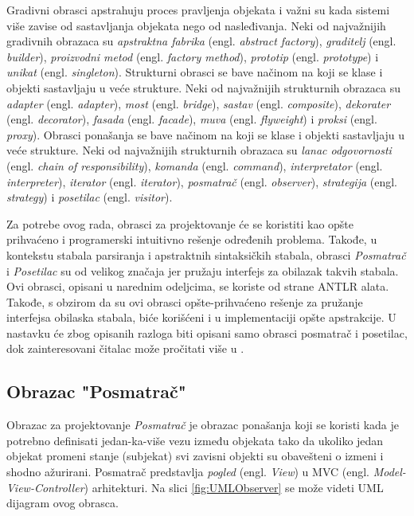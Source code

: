 Gradivni obrasci apstrahuju proces pravljenja objekata i važni su kada sistemi više zavise od sastavljanja objekata nego od nasleđivanja. Neki od najvažnijih gradivnih obrazaca su \emph{apstraktna fabrika} (engl. \emph{abstract factory}), \emph{graditelj} (engl. \emph{builder}), \emph{proizvodni metod} (engl. \emph{factory method}), \emph{prototip} (engl. \emph{prototype}) i \emph{unikat} (engl. \emph{singleton}). Strukturni obrasci se bave načinom na koji se klase i objekti sastavljaju u veće strukture. Neki od najvažnijih strukturnih obrazaca su \emph{adapter} (engl. \emph{adapter}), \emph{most} (engl. \emph{bridge}), \emph{sastav} (engl. \emph{composite}), \emph{dekorater} (engl. \emph{decorator}), \emph{fasada} (engl. \emph{facade}), \emph{muva} (engl. \emph{flyweight}) i \emph{proksi} (engl. \emph{proxy}). Obrasci ponašanja se bave načinom na koji se klase i objekti sastavljaju u veće strukture. Neki od najvažnijih strukturnih obrazaca su \emph{lanac odgovornosti} (engl. \emph{chain of responsibility}), \emph{komanda} (engl. \emph{command}), \emph{interpretator} (engl. \emph{interpreter}), \emph{iterator} (engl. \emph{iterator}), \emph{posmatrač} (engl. \emph{observer}), \emph{strategija} (engl. \emph{strategy}) i \emph{posetilac} (engl. \emph{visitor}).

Za potrebe ovog rada, obrasci za projektovanje će se koristiti kao opšte prihvaćeno i programerski intuitivno rešenje određenih problema. Takođe, u kontekstu stabala parsiranja i apstraktnih sintaksičkih stabala, obrasci \emph{Posmatrač} i \emph{Posetilac} su od velikog značaja jer pružaju interfejs za obilazak takvih stabala. Ovi obrasci, opisani u narednim odeljcima, se koriste od strane ANTLR alata. Takođe, s obzirom da su ovi obrasci opšte-prihvaćeno rešenje za pružanje interfejsa obilaska stabala, biće korišćeni i u implementaciji opšte apstrakcije. U nastavku će zbog opisanih razloga biti opisani samo obrasci posmatrač i posetilac, dok zainteresovani čitalac može pročitati više u \cite{DesignPatternsBook}.

\subsection{Obrazac "Posmatrač"}
\label{subsec:DesignPatternsObserver}

Obrazac za projektovanje \emph{Posmatrač} je obrazac ponašanja koji se koristi kada je potrebno definisati jedan-ka-više vezu između objekata tako da ukoliko jedan objekat promeni stanje (subjekat) svi zavisni objekti su obavešteni o izmeni i shodno ažurirani. Posmatrač predstavlja \emph{pogled} (engl. \emph{View}) u MVC (engl. \emph{Model-View-Controller}) arhitekturi. Na slici \ref{fig:UMLObserver} se može videti UML dijagram \cite{UML} ovog obrasca. 

